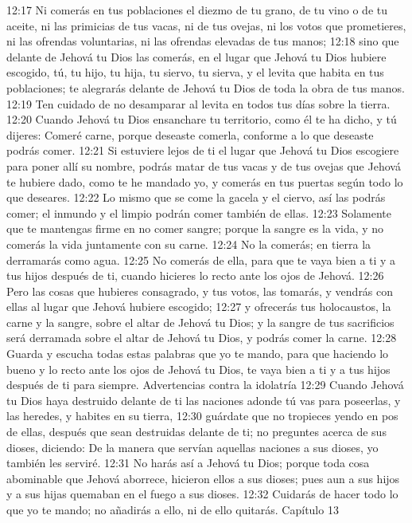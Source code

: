 12:17 Ni comerás en tus poblaciones el diezmo de tu grano, de tu vino o de tu aceite, ni las primicias de tus vacas, ni de tus ovejas, ni los votos que prometieres, ni las ofrendas voluntarias, ni las ofrendas elevadas de tus manos;  
12:18 sino que delante de Jehová tu Dios las comerás, en el lugar que Jehová tu Dios hubiere escogido, tú, tu hijo, tu hija, tu siervo, tu sierva, y el levita que habita en tus poblaciones; te alegrarás delante de Jehová tu Dios de toda la obra de tus manos.  
12:19 Ten cuidado de no desamparar al levita en todos tus días sobre la tierra.  
12:20 Cuando Jehová tu Dios ensanchare tu territorio, como él te ha dicho, y tú dijeres: Comeré carne, porque deseaste comerla, conforme a lo que deseaste podrás comer.  
12:21 Si estuviere lejos de ti el lugar que Jehová tu Dios escogiere para poner allí su nombre, podrás matar de tus vacas y de tus ovejas que Jehová te hubiere dado, como te he mandado yo, y comerás en tus puertas según todo lo que deseares.  
12:22 Lo mismo que se come la gacela y el ciervo, así las podrás comer; el inmundo y el limpio podrán comer también de ellas.  
12:23 Solamente que te mantengas firme en no comer sangre; porque la sangre es la vida, y no comerás la vida juntamente con su carne.  
12:24 No la comerás; en tierra la derramarás como agua.  
12:25 No comerás de ella, para que te vaya bien a ti y a tus hijos después de ti, cuando hicieres lo recto ante los ojos de Jehová.  
12:26 Pero las cosas que hubieres consagrado, y tus votos, las tomarás, y vendrás con ellas al lugar que Jehová hubiere escogido;  
12:27 y ofrecerás tus holocaustos, la carne y la sangre, sobre el altar de Jehová tu Dios; y la sangre de tus sacrificios será derramada sobre el altar de Jehová tu Dios, y podrás comer la carne.  
12:28 Guarda y escucha todas estas palabras que yo te mando, para que haciendo lo bueno y lo recto ante los ojos de Jehová tu Dios, te vaya bien a ti y a tus hijos después de ti para siempre.  
Advertencias contra la idolatría  
12:29 Cuando Jehová tu Dios haya destruido delante de ti las naciones adonde tú vas para poseerlas, y las heredes, y habites en su tierra,  
12:30 guárdate que no tropieces yendo en pos de ellas, después que sean destruidas delante de ti; no preguntes acerca de sus dioses, diciendo: De la manera que servían aquellas naciones a sus dioses, yo también les serviré.  
12:31 No harás así a Jehová tu Dios; porque toda cosa abominable que Jehová aborrece, hicieron ellos a sus dioses; pues aun a sus hijos y a sus hijas quemaban en el fuego a sus dioses.  
12:32 Cuidarás de hacer todo lo que yo te mando; no añadirás a ello, ni de ello quitarás.  
Capítulo 13 

